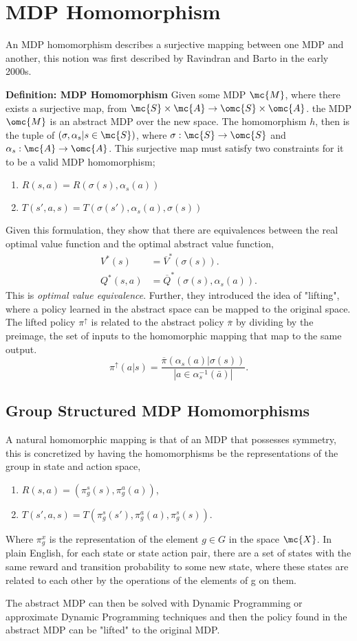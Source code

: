 \section{MDP Homomorphism}
An MDP homomorphism describes a surjective mapping between one MDP and another, this notion was first described by Ravindran and Barto in the early 2000s\cite{ravindran2003smdp, Ravindran2001SymmetriesAM}.

\textbf{Definition: MDP Homomorphism} Given some MDP $\mc{M}$, where there exists a surjective map, from $\mc{S} \times \mc{A} \rightarrow \omc{S} \times \omc{A}$. the MDP $\omc{M}$ is an abstract MDP over the new space. The homomorphism $h$, then is the tuple of $(\sigma, \alpha_s|s \in \mc{S})$, where $\sigma: \mc{S} \rightarrow \omc{S}$ and $\alpha_s : \mc{A} \rightarrow \omc{A}$. This surjective map must satisfy two constraints for it to be a valid MDP homomorphism;
\begin{enumerate}
	\item $R(s, a) = R(\sigma(s), \alpha_s(a))$
	\item $T(s', a, s) = T(\sigma(s'), \alpha_s(a), \sigma(s))$
\end{enumerate}

Given this formulation, they show that there are equivalences between the real optimal value function and the optimal abstract value function,
\begin{align*}
	V^*(s)    & = \overline{V}^*(\sigma(s)).              \\
	Q^*(s, a) & = \overline{Q}^*(\sigma(s), \alpha_s(a)).
\end{align*}
This is \textit{optimal value equivalence}. Further, they introduced the idea of "lifting", where a policy learned in the abstract space can be mapped to the original space. The lifted policy $\pi^\uparrow$ is related to the abstract policy $\overline{\pi}$ by dividing by the preimage, the set of inputs to the homomorphic mapping that map to the same output.
\begin{equation}
	\pi^\uparrow(a | s) = \frac{\overline{\pi}(\alpha_s(a) | \sigma(s))}{| a \in \alpha^{-1}_s(\bar{a})|}.
\end{equation}

\subsection{Group Structured MDP Homomorphisms}
A natural homomorphic mapping is that of an MDP that possesses symmetry, this is concretized by having the homomorphisms be the representations of the group in state and action space,
\begin{enumerate}
	\item $R(s, a) = (\pi^s_g(s), \pi_g^a(a))$,
	\item $T(s', a, s) =T(\pi_g^s(s'), \pi_g^a(a), \pi_g^s(s))$.
\end{enumerate}
Where $\pi_g^x$ is the representation of the element $g \in G$ in the space $\mc{X}$. In plain English, for each state or state action pair, there are a set of states with the same reward and transition probability to some new state, where these states are related to each other by the operations of the elements of g on them.



The abstract MDP can then be solved with Dynamic Programming or approximate Dynamic Programming techniques and then the policy found in the abstract MDP can be "lifted" to the original MDP.

